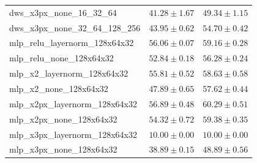 \begin{table}[h]
\begin{tabular}{lrr}
dws\_x3px\_none\_16\_32\_64 & $41.28\mathbin{\pm}1.67$ & $49.34\mathbin{\pm}1.15$ \\
dws\_x3px\_none\_32\_64\_128\_256 & $43.95\mathbin{\pm}0.62$ & $54.70\mathbin{\pm}0.42$ \\
mlp\_relu\_layernorm\_128x64x32 & $56.06\mathbin{\pm}0.07$ & $59.16\mathbin{\pm}0.28$ \\
mlp\_relu\_none\_128x64x32 & $52.84\mathbin{\pm}0.18$ & $56.28\mathbin{\pm}0.24$ \\
mlp\_x2\_layernorm\_128x64x32 & $55.81\mathbin{\pm}0.52$ & $58.63\mathbin{\pm}0.58$ \\
mlp\_x2\_none\_128x64x32 & $47.89\mathbin{\pm}0.65$ & $57.62\mathbin{\pm}0.44$ \\
mlp\_x2px\_layernorm\_128x64x32 & $56.89\mathbin{\pm}0.48$ & $60.29\mathbin{\pm}0.51$ \\
mlp\_x2px\_none\_128x64x32 & $54.32\mathbin{\pm}0.72$ & $59.38\mathbin{\pm}0.35$ \\
mlp\_x3px\_layernorm\_128x64x32 & $10.00\mathbin{\pm}0.00$ & $10.00\mathbin{\pm}0.00$ \\
mlp\_x3px\_none\_128x64x32 & $38.89\mathbin{\pm}0.15$ & $48.89\mathbin{\pm}0.56$ \\
\bottomrule
\end{tabular}
\end{table}
